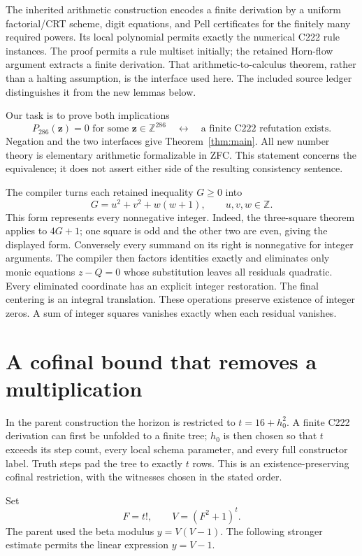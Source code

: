 \documentclass[11pt]{article}
\theoremstyle{remark}\newtheorem{remark}[theorem]{Remark}
\newcommand{\Z}{\mathbb Z}\newcommand{\N}{\mathbb N}
\begin{document}
The inherited arithmetic construction encodes a finite derivation by a
uniform factorial/CRT scheme, digit equations, and Pell certificates for
the finitely many required powers. Its local polynomial permits exactly
the numerical C222 rule instances. The proof permits a rule multiset
initially; the retained Horn-flow argument extracts a finite derivation.
That arithmetic-to-calculus theorem, rather than a halting assumption,
is the interface used here. The included source ledger distinguishes it
from the new lemmas below.

Our task is to prove both implications
\[
 P_{286}(\mathbf z)=0\text{ for some }\mathbf z\in\Z^{286}
 \quad\longleftrightarrow\quad
 \text{a finite C222 refutation exists}.
\]
Negation and the two interfaces give Theorem~\ref{thm:main}. All new number
theory is elementary arithmetic formalizable in ZFC. This statement concerns
the equivalence; it does not assert either side of the resulting consistency
sentence.

The compiler turns each retained inequality $G\ge0$ into
\[
 G=u^2+v^2+w(w+1),\qquad u,v,w\in\Z.
\]
This form represents every nonnegative integer. Indeed, the three-square
theorem applies to $4G+1$; one square is odd and the other two are even,
giving the displayed form. Conversely every summand on its right is
nonnegative for integer arguments. The compiler then factors identities
exactly and eliminates only monic equations $z-Q=0$ whose substitution
leaves all residuals quadratic. Every eliminated coordinate has an explicit
integer restoration. The final centering is an integral translation.
These operations preserve existence of integer zeros. A sum of integer
squares vanishes exactly when each residual vanishes.

\section{A cofinal bound that removes a multiplication}\label{sec:cofinal}

In the parent construction the horizon is restricted to
$t=16+h_0^2$. A finite C222 derivation can first be unfolded to a finite
tree; $h_0$ is then chosen so that $t$ exceeds its step count, every local
schema parameter, and every full constructor label. Truth steps pad the
tree to exactly $t$ rows. This is an existence-preserving cofinal
restriction, with the witnesses chosen in the stated order.

Set
\[
 F=t!,\qquad V=(F^2+1)^t.
\]
The parent used the beta modulus $y=V(V-1)$. The following stronger estimate
permits the linear expression $y=V-1$.
\end{document}
